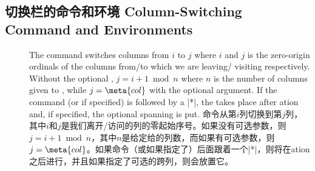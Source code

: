 \subsection{切换栏的命令和环境 \hfill Column-Switching Command and Environments}
\label{sec:ref-switchcolumn}

\begin{description}
\item[\Midx{\!\switchcolumn!}]\mbox{}
\mbox{}\par
{}
\begin{paracol}{2}
The command switches columns from $i$ to $j$ where $i$ and $j$ is the
zero-origin ordinals of the columns from/to which we are leaving\slash
visiting respectively.  Without the optional , $j=i+1\bmod n$
where $n$ is the number of columns given to \beginparacol, while
$j=\meta{col}$ with the optional argument.  If the command (or
 if specified) is followed by a |*|, the \cswitch{} takes
place after \sync{}ation and, if specified, the optional spanning
 is put.
\switchcolumn
命令从第$i$列切换到第$j$列，其中$i$和$j$是我们离开/访问的列的零起始序号。如果没有可选参数，则$j=i+1\bmod n$，其中$n$是给定给\beginparacol{}的列数，而如果有可选参数，则$j=\meta{col}$。如果命令（或如果指定了）后面跟着一个|*|，则\cswitch{}将在\sync{}ation之后进行，并且如果指定了可选的跨列，则会放置它。
\end{paracol}


\end{description}
